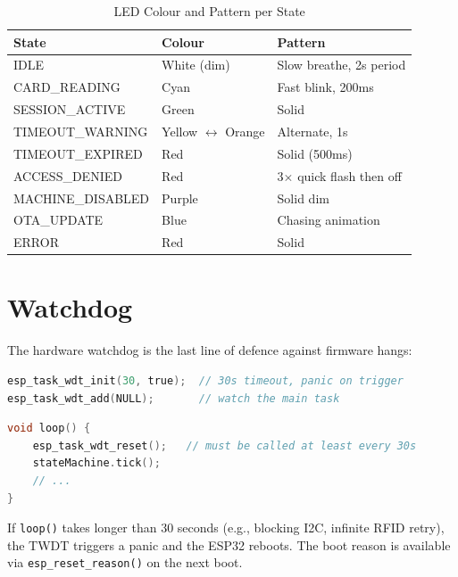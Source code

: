 \begin{table}[H]
\centering
\caption{LED Colour and Pattern per State}
\begin{tabular}{L{3.5cm}L{3cm}L{7cm}}
\toprule
\textbf{State} & \textbf{Colour} & \textbf{Pattern} \\
\midrule
IDLE & White (dim) & Slow breathe, 2s period \\
CARD\_READING & Cyan & Fast blink, 200ms \\
SESSION\_ACTIVE & Green & Solid \\
TIMEOUT\_WARNING & Yellow $\leftrightarrow$ Orange & Alternate, 1s \\
TIMEOUT\_EXPIRED & Red & Solid (500ms) \\
ACCESS\_DENIED & Red & 3$\times$ quick flash then off \\
MACHINE\_DISABLED & Purple & Solid dim \\
OTA\_UPDATE & Blue & Chasing animation \\
ERROR & Red & Solid \\
\bottomrule
\end{tabular}
\end{table}

\section{Watchdog}

The hardware watchdog is the last line of defence against firmware hangs:

\begin{lstlisting}[language=C,caption={Watchdog initialisation in setup()}]
esp_task_wdt_init(30, true);  // 30s timeout, panic on trigger
esp_task_wdt_add(NULL);       // watch the main task
\end{lstlisting}

\begin{lstlisting}[language=C,caption={Watchdog feed in main loop}]
void loop() {
    esp_task_wdt_reset();   // must be called at least every 30s
    stateMachine.tick();
    // ...
}
\end{lstlisting}

If \texttt{loop()} takes longer than 30 seconds (e.g., blocking I2C, infinite RFID retry), the TWDT triggers a panic and the ESP32 reboots. The boot reason is available via \texttt{esp\_reset\_reason()} on the next boot.
